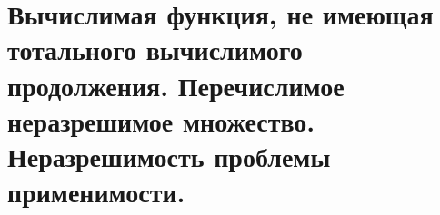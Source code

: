 \section{Вычислимая функция, не имеющая тотального вычислимого продолжения. Перечислимое неразрешимое множество. Неразрешимость проблемы применимости.}